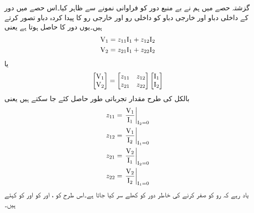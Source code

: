 گزشتہ حصے میں ہم نے بے منبع دور  کو فراوانی نمونے سے ظاہر کیا۔اس حصے میں دور کے داخلی دباو   اور خارجی دباو   کو داخلی رو  اور خارجی رو  کا پیدا کردہ دباو تصور کرتے ہیں۔یوں دور کا  حاصل ہوتا ہے یعنی  
\begin{gather}
\begin{aligned}
{\ensuremath{{\textup{V}}}}_1&=z_{11}{{\textup{I}}}_1+z_{12}{{\textup{I}}}_2\\
{{\textup{V}}}_2&=z_{21} {{\textup{I}}}_1+z_{22} {{\textup{I}}}_2
\end{aligned}
\end{gather}
یا
\begin{align}\label{مساوات_نمونہ_رکاوٹی}
\begin{bmatrix}
{\ensuremath{{\textup{V}}}}_1\\
{{\textup{V}}}_2
\end{bmatrix}
=
\begin{bmatrix}
z_{11} & z_{12}\\
z_{21}& z_{22}
\end{bmatrix}
\begin{bmatrix}
{\ensuremath{{\textup{I}}}}_1\\
{{\textup{I}}}_2
\end{bmatrix}
\end{align}
بالکل  کی طرح  مقدار تجرباتی طور حاصل کئے جا سکتے ہیں یعنی
\begin{gather}
\begin{aligned} 
z_{11}&=\left. \frac{{{\textup{V}}}_1}{{{\textup{I}}}_1}\right|_{{{\textup{I}}}_2=0}\\
z_{12}&=\left. \frac{{{\textup{V}}}_1}{{{\textup{I}}}_2}\right|_{{{\textup{I}}}_1=0}\\
z_{21}&=\left. \frac{{{\textup{V}}}_2}{{{\textup{I}}}_1}\right|_{{{\textup{I}}}_2=0}\\
z_{22}&=\left. \frac{{{\textup{V}}}_2}{{{\textup{I}}}_2}\right|_{{{\textup{I}}}_1=0}
\end{aligned}
\end{gather}
یاد رہے کہ رو کو صفر کرنے کی خاطر دور کو کھلے سر کیا جاتا ہے۔اس طرح  کو ،  اور  کو  اور  کو  کہتے ہیں۔
